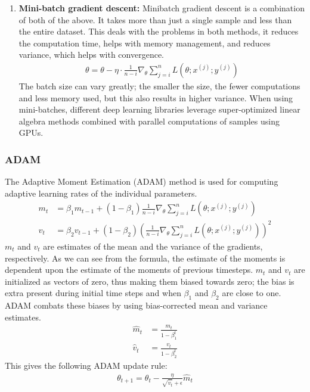 \documentclass[a4paper,12pt]{article}
\begin{document}
\begin{enumerate}
\item \textbf{Mini-batch gradient descent:}
Minibatch gradient descent is a combination of both of the above. It takes more than just a single sample and less than the entire dataset. This deals with the problems in both methods, it reduces the computation time, helps with memory management, and reduces variance, which helps with convergence.
\begin{align}
  \theta = \theta - \eta \cdot \frac{1}{n-i}\nabla_\theta \sum_{j = i}^{n} L(\theta; x^{(j)}; y^{(j)})
\end{align}
The batch size can vary greatly; the smaller the size, the fewer computations and less memory used, but this also results in higher variance.
When using mini-batches, different deep learning libraries leverage super-optimized linear algebra methods combined with parallel computations of samples using GPUs.
\end{enumerate}
\subsubsection{ADAM}
The Adaptive Moment Estimation (ADAM) method is used for computing adaptive learning rates of the individual parameters.
\begin{align}
m_t &= \beta_1 m_{t-1} + (1 - \beta_1) \frac{1}{n-i}\nabla_\theta \sum_{j = i}^{n} L(\theta; x^{(j)}; y^{(j)}) \\
v_t &= \beta_2 v_{t-1} + (1 - \beta_2) (\frac{1}{n-i}\nabla_\theta \sum_{j = i}^{n} L(\theta; x^{(j)}; y^{(j)}))^2
\end{align}
$m_t$ and $v_t$ are estimates of the mean and the variance of the gradients, respectively. As we can see from the formula, the estimate of the moments is dependent upon the estimate of the moments of previous timesteps. $m_t$ and $v_t$ are initialized as vectors of zero, thus making them biased towards zero; the bias is extra present during initial time steps and when $\beta_1$ and $\beta_2$ are close to one.
ADAM combats these biases by using bias-corrected mean and variance estimates.
\begin{align}
\hat{m}_t &= \frac{m_t}{1 - \beta_1^t} \\
\hat{v}_t &= \frac{v_t}{1 - \beta_2^t}
\end{align}
This gives the following ADAM update rule:
\begin{align}
\theta_{t+1} = \theta_t - \frac{\eta}{\sqrt{\hat{v}_t} + \epsilon} \hat{m}_t
\end{align}
\end{document}
